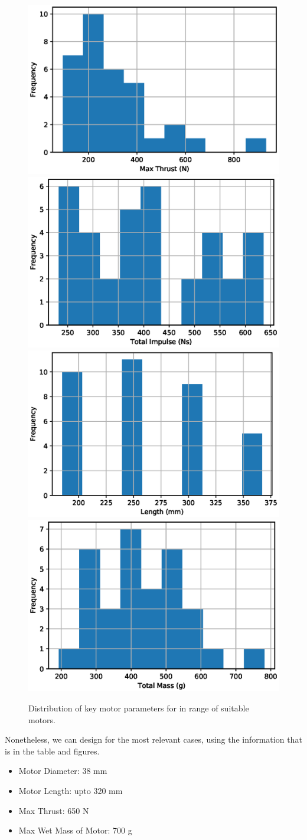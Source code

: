 \documentclass[11pt]{article}
\begin{document}
\begin{figure}[tbhp]
   \centering
   \includegraphics[width=0.45\linewidth]{figs/Max_Thrust_Distribution.eps}
    \includegraphics[width=0.45\linewidth]{figs/total_impulse_Distribution.eps}
    \includegraphics[width=0.45\linewidth]{figs/Length_Distribution.eps}
    \includegraphics[width=0.45\linewidth]{figs/total_weight_Distribution.eps}
   \caption{Distribution of key motor parameters for in range of suitable motors.}
   \label{fig:suitable_motor_distribution}
\end{figure}

Nonetheless, we can design for the most relevant cases, using the information that is in the table and figures. 

\begin{itemize}
\item Motor Diameter: 38 mm
\item Motor Length: upto 320 mm
\item Max Thrust:  650 N
\item Max Wet Mass of Motor: 700 g
\end{itemize}
\end{document}
